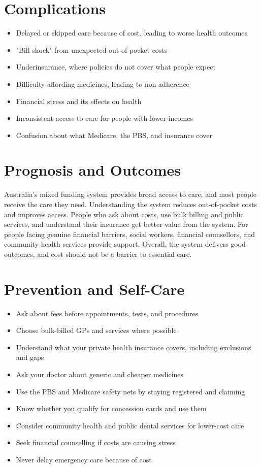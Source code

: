 \section*{Complications}
\begin{itemize}
    \item Delayed or skipped care because of cost, leading to worse health outcomes
    \item "Bill shock" from unexpected out-of-pocket costs
    \item Underinsurance, where policies do not cover what people expect
    \item Difficulty affording medicines, leading to non-adherence
    \item Financial stress and its effects on health
    \item Inconsistent access to care for people with lower incomes
    \item Confusion about what Medicare, the PBS, and insurance cover
\end{itemize}

\section*{Prognosis and Outcomes}
Australia's mixed funding system provides broad access to care, and most people receive the care they need. Understanding the system reduces out-of-pocket costs and improves access. People who ask about costs, use bulk billing and public services, and understand their insurance get better value from the system. For people facing genuine financial barriers, social workers, financial counsellors, and community health services provide support. Overall, the system delivers good outcomes, and cost should not be a barrier to essential care.

\section*{Prevention and Self-Care}
\begin{itemize}
    \item Ask about fees before appointments, tests, and procedures
    \item Choose bulk-billed GPs and services where possible
    \item Understand what your private health insurance covers, including exclusions and gaps
    \item Ask your doctor about generic and cheaper medicines
    \item Use the PBS and Medicare safety nets by staying registered and claiming
    \item Know whether you qualify for concession cards and use them
    \item Consider community health and public dental services for lower-cost care
    \item Seek financial counselling if costs are causing stress
    \item Never delay emergency care because of cost
\end{itemize}

